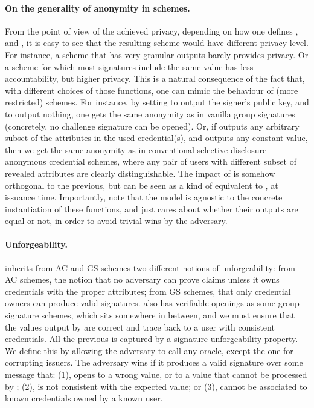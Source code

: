 \paragraph{On the generality of anonymity in \UAS schemes.} %
From the point of view of the achieved privacy, depending on how one defines
\fissue, \feval and \finsp, it is easy to see that the resulting scheme would
have different privacy level. For instance, a scheme that has very granular
\feval outputs barely provides privacy. Or a scheme for which most signatures
include the same \finsp value has less accountability, but higher privacy.
%
This is a natural consequence of the fact that, with different choices of those
functions, one can mimic the behaviour of (more restricted) schemes. For
instance, by setting \finsp to output the signer's public key, and \feval to
output nothing, one gets the same anonymity as in vanilla group signatures
(concretely, no challenge signature can be opened). Or, if \feval outputs any
arbitrary subset of the attributes in the used credential(s), and \finsp outputs
any constant value, then we get the same anonymity as in conventional selective
disclosure anonymous credential schemes, where any pair of users with different
subset of revealed attributes are clearly distinguishable. The impact of \fissue
is somehow orthogonal to the previous, but can be seen as a kind of equivalent
to \feval, at issuance time.
%
Importantly, note that the model is agnostic to the concrete instantiation of
these functions, and just cares about whether their outputs are equal or not,
in order to avoid trivial wins by the adversary.

\paragraph{Unforgeability.} \UAS inherits from AC and GS schemes two different
notions of unforgeability: from AC schemes, the notion that no adversary can
prove claims unless it owns credentials with the proper attributes; from GS
schemes, that only credential owners can produce valid signatures. \UAS also
has verifiable openings as some group signature schemes, which sits somewhere
in between, and we must ensure that the values output by \Open are correct and
trace back to a user with consistent credentials. All the previous is captured
by a signature unforgeability property. We define this by allowing the adversary
to call any oracle, except the one for corrupting issuers. The adversary wins if
it produces a valid signature over some message that: (1), opens to a wrong
value, or to a value that cannot be processed by \Judge; (2), is not consistent
with the expected \Yeval value; or (3), cannot be associated to known
credentials owned by a known user.

